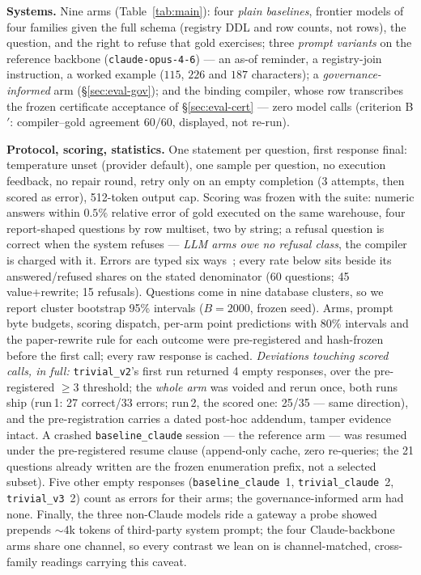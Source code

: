 \smallskip\noindent{}\textbf{Systems.} Nine arms (Table~\ref{tab:main}): four
\emph{plain baselines}, frontier models of four families given the full
schema (registry DDL and row counts, not rows), the question, and the
right to refuse that gold exercises; three \emph{prompt variants} on
the reference backbone (\texttt{claude-opus-4-6}) --- an as-of reminder, a
registry-join instruction, a worked example ($115$, $226$ and $187$
characters); a \emph{governance-informed}
arm (\S\ref{sec:eval-gov}); and the binding compiler, whose row transcribes
the frozen certificate acceptance of \S\ref{sec:eval-cert} --- zero model
calls (criterion B$'$: compiler--gold agreement $60/60$, displayed, not
re-run).

\smallskip\noindent{}\textbf{Protocol, scoring, statistics.} One statement
per question, first response final: temperature unset (provider default),
one sample per question, no execution feedback, no repair round,
retry only on an empty completion (3 attempts, then scored as error),
512-token output cap. Scoring was frozen with the suite: numeric answers
within $0.5\%$ relative error of gold executed on the same warehouse, four
report-shaped questions by row multiset, two by string; a refusal question
is correct when the system refuses --- \emph{LLM arms owe no refusal
class}, the compiler is charged with it. Errors are typed six
ways~\cite{asofgov-tr}; every rate below sits beside its
answered/refused shares on the stated denominator (60 questions; 45
value+rewrite; 15 refusals). Questions come in nine database clusters, so we
report cluster bootstrap 95\% intervals ($B{=}2000$, frozen seed). Arms, prompt byte
budgets, scoring dispatch, per-arm point predictions with 80\% intervals and
the paper-rewrite rule for each outcome were pre-registered and hash-frozen
before the first call; every raw response is cached. \emph{Deviations touching
scored calls, in full:}
\texttt{trivial\_v2}'s first run returned 4 empty responses, over the
pre-registered $\geq$3 threshold; the \emph{whole arm} was voided and rerun
once, both runs ship (run\,1: 27 correct/33 errors; run\,2, the scored one:
25/35 --- same direction), and the pre-registration carries a dated
post-hoc addendum, tamper evidence intact. A crashed
\texttt{baseline\_claude} session --- the reference arm --- was
resumed under the pre-registered resume clause (append-only cache, zero
re-queries; the 21 questions already written are the frozen enumeration
prefix, not a selected subset). Five other empty responses (\texttt{baseline\_claude}~1,
\texttt{trivial\_claude}~2, \texttt{trivial\_v3}~2) count as errors for
their arms; the governance-informed arm had none. Finally, the three
non-Claude models ride a gateway a probe showed prepends ${\sim}4$k tokens of
third-party system prompt; the four Claude-backbone arms share one channel,
so every contrast we lean on is channel-matched, cross-family readings
carrying this caveat.

